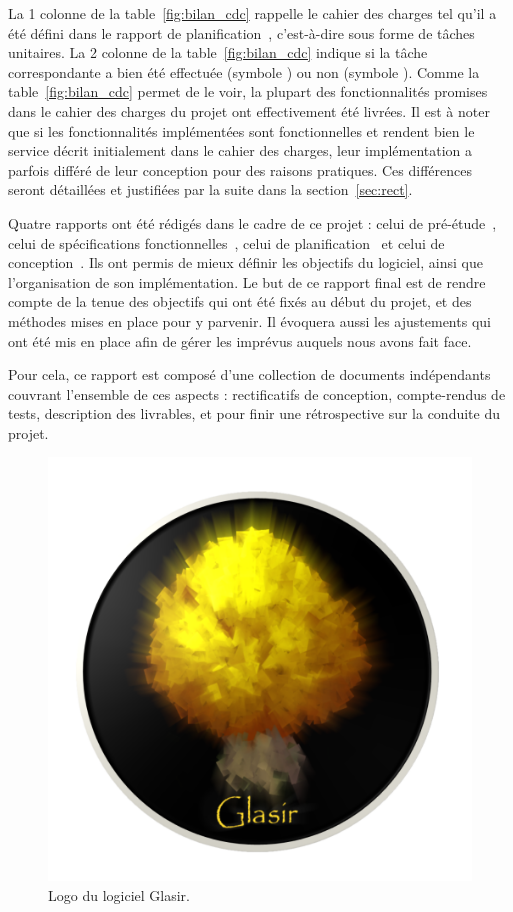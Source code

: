    La 1\iere{} colonne de la {\sc table}~\ref{fig:bilan_cdc} rappelle le cahier des charges tel qu'il a été défini dans le rapport de planification~\cite{planif}, c'est-à-dire sous forme de tâches unitaires. La 2\ieme{} colonne de la {\sc table}~\ref{fig:bilan_cdc} indique si la tâche correspondante a bien été effectuée (symbole \textcolor{bo_vert}{}) ou non (symbole \textcolor{nouvo_rouge}{}). Comme la {\sc table}~\ref{fig:bilan_cdc} permet de le voir, la plupart des fonctionnalités promises dans le cahier des charges du projet ont effectivement été livrées. Il est à noter que si les fonctionnalités implémentées sont fonctionnelles et rendent bien le service décrit initialement dans le cahier des charges, leur implémentation a parfois différé de leur conception pour des raisons pratiques. Ces différences seront détaillées et justifiées par la suite dans la {\sc section}~\ref{sec:rect}.

    Quatre rapports ont été rédigés dans le cadre de ce projet : celui de pré-étude~\cite{pre_etude}, celui de spécifications fonctionnelles~\cite{spec_fonc}, celui de planification~\cite{planif} et celui de conception~\cite{conception}. Ils ont permis de mieux définir les objectifs du logiciel, ainsi que l'organisation de son implémentation. Le but de ce rapport final est de rendre compte de la tenue des objectifs qui ont été fixés au début du projet, et des méthodes mises en place pour y parvenir. Il évoquera aussi les ajustements qui ont été mis en place afin de gérer les imprévus auquels nous avons fait face. 

    Pour cela, ce rapport est composé d'une collection de documents indépendants couvrant l'ensemble de ces aspects : rectificatifs de conception, compte-rendus de tests, description des livrables, et pour finir une rétrospective sur la conduite du projet.

    \vspace{4mm}

    \begin{figure}[!h]
        \centering
        \includegraphics[height=0.5\textwidth]{figure/glasir.png}
        \caption{Logo du logiciel Glasir.}
        \label{fig:glasir}
    \end{figure}